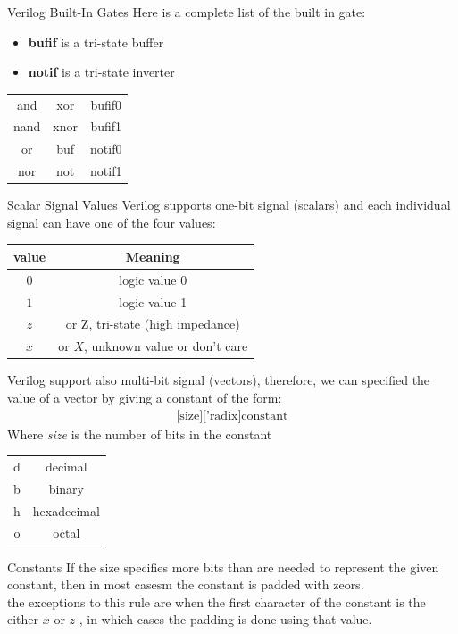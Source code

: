 \begin{parag}{Verilog Built-In Gates}
    Here is a complete list of the built in gate:
    \begin{itemize}
        \item \textbf{bufif} is a tri-state buffer
        \item \textbf{notif} is a tri-state inverter
    \end{itemize}
    \begin{center}
    \begin{tabular}{ccc}
        \hline
        and & xor & bufif0\\
        nand & xnor & bufif1\\
        or & buf & notif0\\
        nor & not & notif1
    \end{tabular}
    \end{center}
\end{parag}
\begin{parag}{Scalar  Signal Values}
    Verilog supports one-bit signal (scalars) and each individual signal can have one of the four values:
    \begin{center}
    \begin{tabular}{cc}
        \hline
        value & Meaning\\
        \hline
        $0$ & logic value $0$\\
        $1$ & logic value 1\\
        $z$ & or Z, tri-state (high impedance)\\
        $x$ & or $X$, unknown value or don't care
    \end{tabular}
    \end{center}
    Verilog support also multi-bit signal (vectors), therefore, we can specified the value of a vector by giving a constant of the form:
    \begin{align*}
        \text{[size]['radix]constant}
    \end{align*}
    Where \textit{size} is the number of bits in the constant
    \begin{center}
    \begin{tabular}{cc}
        d & decimal\\
        b & binary\\
        h & hexadecimal\\
        o & octal
    \end{tabular}
    \end{center}
   \begin{subparag}{Constants}
       If the size specifies more bits than are needed to represent the given constant, then in most casesm the constant is padded with zeors.
       \\
       the exceptions to this rule are when the first character of the constant is the either $x$ or $z$ , in which cases the padding is done using that value.
   \end{subparag}
    
\end{parag}

